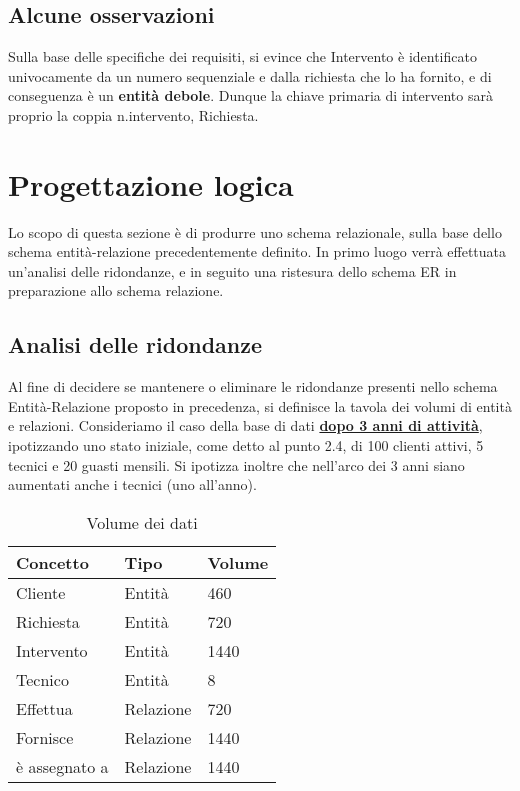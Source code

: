 \documentclass{article}
\begin{document}
\subsection{Alcune osservazioni}
Sulla base delle specifiche dei requisiti, si evince che Intervento è identificato univocamente da un numero sequenziale e dalla richiesta che lo ha fornito, e di conseguenza è un \textbf{entità debole}. Dunque la chiave primaria di intervento sarà proprio la coppia n.intervento, Richiesta.

\section{Progettazione logica}
Lo scopo di questa sezione è di produrre uno schema relazionale, sulla base dello schema entità-relazione precedentemente definito. In primo luogo verrà effettuata un'analisi delle ridondanze, e in seguito una ristesura dello schema ER in preparazione allo schema relazione.

\subsection{Analisi delle ridondanze}
Al fine di decidere se mantenere o eliminare le ridondanze presenti nello schema Entità-Relazione proposto in precedenza, si definisce la tavola dei volumi di entità e relazioni.
Consideriamo il caso della base di dati \underline{\textbf{dopo 3 anni di attività}}, ipotizzando uno stato iniziale, come detto al punto 2.4, di 100 clienti attivi, 5 tecnici e 20 guasti mensili. Si ipotizza inoltre che nell'arco dei 3 anni siano aumentati anche i tecnici (uno all'anno). 

\begin{table}[h]
    \centering
    \begin{adjustbox}{width=1\textwidth}
        \begin{tabular}{|m{5cm}|m{5cm}|m{3cm}|}
            \hline  
            \textbf{Concetto} & \textbf{Tipo} & \textbf{Volume} \\ 
            \hline
            Cliente & Entità & 460 \\ 
            \hline
            Richiesta & Entità & 720 \\
            \hline
            Intervento & Entità & 1440 \\
            \hline
            Tecnico & Entità & 8 \\
            \hline
            Effettua & Relazione & 720 \\
            \hline
            Fornisce & Relazione & 1440\\
            \hline
            è assegnato a & Relazione & 1440 \\
            \hline
        \end{tabular}
    \end{adjustbox}
    \caption{Volume dei dati}
    \label{tab:volumetable}
\end{table}
\end{document}

